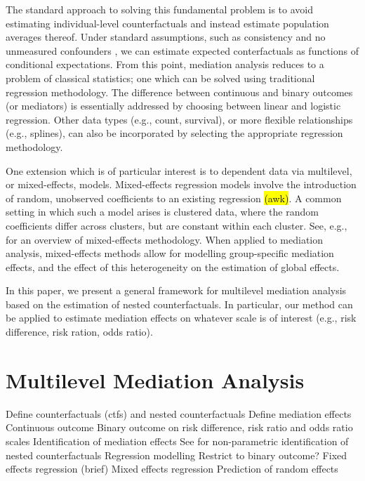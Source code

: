 \documentclass{article}
\begin{document}
The standard approach to solving this fundamental problem is to avoid estimating individual-level counterfactuals and instead estimate population averages thereof. Under standard assumptions, such as consistency and no unmeasured confounders \citep[see, e.g.,][]{Pea09}, we can estimate expected conterfactuals as functions of conditional expectations. From this point, mediation analysis reduces to a problem of classical statistics; one which can be solved using traditional regression methodology. The difference between continuous and binary outcomes (or mediators) is essentially addressed by choosing between linear and logistic regression. Other data types (e.g., count, survival), or more flexible relationships (e.g., splines), can also be incorporated by selecting the appropriate regression methodology.

One extension which is of particular interest is to dependent data via multilevel, or mixed-effects, models. Mixed-effects regression models involve the introduction of random, unobserved coefficients to an existing regression \hl{(awk)}. A common setting in which such a model arises is clustered data, where the random coefficients differ across clusters, but are constant within each cluster. See, e.g., \citet{Dem04} for an overview of mixed-effects methodology. When applied to mediation analysis, mixed-effects methods allow for modelling group-specific mediation effects, and the effect of this heterogeneity on the estimation of global effects.

In this paper, we present a general framework for multilevel mediation analysis based on the estimation of nested counterfactuals. In particular, our method can be applied to estimate mediation effects on whatever scale is of interest (e.g., risk difference, risk ration, odds ratio). 




\section{Multilevel Mediation Analysis}

\begin{outline}
    \1 Define counterfactuals (ctfs) and nested counterfactuals 
    \1 Define mediation effects
        \2 Continuous outcome
        \2 Binary outcome on risk difference, risk ratio and odds ratio scales
    \1 Identification of mediation effects
        \2 See \citet{Ima10I} for non-parametric identification of nested counterfactuals
    \1 Regression modelling
        \2 Restrict to binary outcome?
        \2 Fixed effects regression (brief)
        \2 Mixed effects regression
        \2 Prediction of random effects
\end{outline}
\end{document}
